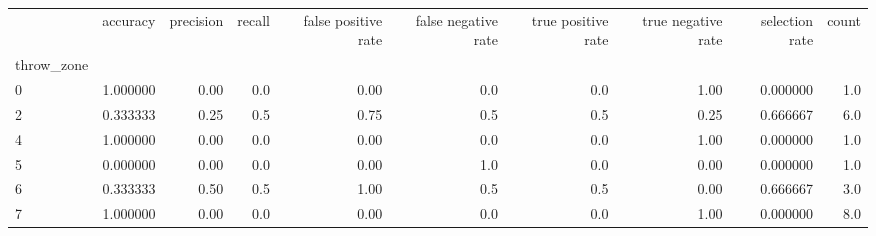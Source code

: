 \begin{tabular}{lrrrrrrrrr}
\toprule
{} &  accuracy &  precision &  recall &  false positive rate &  false negative rate &  true positive rate &  true negative rate &  selection rate &  count \\
throw\_zone &           &            &         &                      &                      &                     &                     &                 &        \\
\midrule
0          &  1.000000 &       0.00 &     0.0 &                 0.00 &                  0.0 &                 0.0 &                1.00 &        0.000000 &    1.0 \\
2          &  0.333333 &       0.25 &     0.5 &                 0.75 &                  0.5 &                 0.5 &                0.25 &        0.666667 &    6.0 \\
4          &  1.000000 &       0.00 &     0.0 &                 0.00 &                  0.0 &                 0.0 &                1.00 &        0.000000 &    1.0 \\
5          &  0.000000 &       0.00 &     0.0 &                 0.00 &                  1.0 &                 0.0 &                0.00 &        0.000000 &    1.0 \\
6          &  0.333333 &       0.50 &     0.5 &                 1.00 &                  0.5 &                 0.5 &                0.00 &        0.666667 &    3.0 \\
7          &  1.000000 &       0.00 &     0.0 &                 0.00 &                  0.0 &                 0.0 &                1.00 &        0.000000 &    8.0 \\
\bottomrule
\end{tabular}
